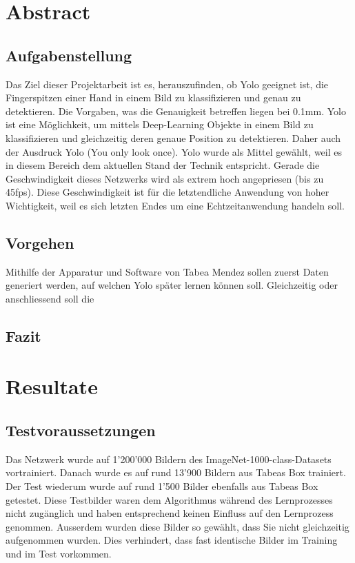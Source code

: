 \documentclass[a4paper,12pt]{article}
\begin{document}
\newpage
\tableofcontents
\listoffigures

\newpage
\section{Abstract}
\subsection{Aufgabenstellung}
Das Ziel dieser Projektarbeit ist es, herauszufinden, ob Yolo geeignet ist, die Fingerspitzen einer Hand in einem Bild zu klassifizieren und genau zu detektieren. 
Die Vorgaben, was die Genauigkeit betreffen liegen bei 0.1mm.
Yolo ist eine Möglichkeit, um mittels Deep-Learning Objekte in einem Bild zu klassifizieren und gleichzeitig deren genaue Position zu detektieren. 
Daher auch der Ausdruck Yolo (You only look once).
Yolo wurde als Mittel gewählt, weil es in diesem Bereich dem aktuellen Stand der Technik entspricht. 
Gerade die Geschwindigkeit dieses Netzwerks wird als extrem hoch angepriesen (bis zu 45fps).
Diese Geschwindigkeit ist für die letztendliche Anwendung von hoher Wichtigkeit, weil es sich letzten Endes um eine Echtzeitanwendung handeln soll. 

\subsection{Vorgehen}
Mithilfe der Apparatur und Software von Tabea Mendez sollen zuerst Daten generiert werden, auf welchen Yolo später lernen können soll. 
Gleichzeitig oder anschliessend soll die %
\subsection{Fazit}


\newpage
\section{Resultate}

\subsection{Testvoraussetzungen}
Das Netzwerk wurde auf 1'200'000 Bildern des ImageNet-1000-class-Datasets vortrainiert.
Danach wurde es auf rund 13'900 Bildern aus Tabeas Box trainiert. 
Der Test wiederum wurde auf rund 1'500 Bilder ebenfalls aus Tabeas Box getestet. 
Diese Testbilder waren dem Algorithmus während des Lernprozesses nicht zugänglich und haben entsprechend keinen Einfluss auf den Lernprozess genommen. 
Ausserdem wurden diese Bilder so gewählt, dass Sie nicht gleichzeitig aufgenommen wurden. 
Dies verhindert, dass fast identische Bilder im Training und im Test vorkommen. 
\end{document}
